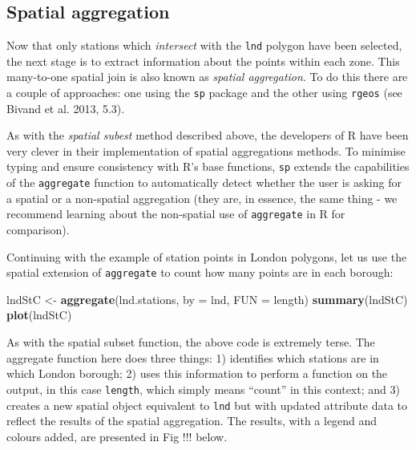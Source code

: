 \documentclass[]{article}
\newenvironment{Shaded}{}{}
\newcommand{\KeywordTok}[1]{\textcolor[rgb]{0.00,0.44,0.13}{\textbf{{#1}}}}
\newcommand{\DataTypeTok}[1]{\textcolor[rgb]{0.56,0.13,0.00}{{#1}}}
\newcommand{\StringTok}[1]{\textcolor[rgb]{0.25,0.44,0.63}{{#1}}}
\newcommand{\NormalTok}[1]{{#1}}
\begin{document}
\subsection{Spatial aggregation}

Now that only stations which \emph{intersect} with the \texttt{lnd}
polygon have been selected, the next stage is to extract information
about the points within each zone. This many-to-one spatial join is also
known as \emph{spatial aggregation}. To do this there are a couple of
approaches: one using the \texttt{sp} package and the other using
\texttt{rgeos} (see Bivand et al. 2013, 5.3).

As with the \emph{spatial subest} method described above, the developers
of R have been very clever in their implementation of spatial
aggregations methods. To minimise typing and ensure consistency with R's
base functions, \texttt{sp} extends the capabilities of the
\texttt{aggregate} function to automatically detect whether the user is
asking for a spatial or a non-spatial aggregation (they are, in essence,
the same thing - we recommend learning about the non-spatial use of
\texttt{aggregate} in R for comparison).

Continuing with the example of station points in London polygons, let us
use the spatial extension of \texttt{aggregate} to count how many points
are in each borough:

\begin{Shaded}
\begin{Highlighting}[]
\NormalTok{lndStC <-}\StringTok{ }\KeywordTok{aggregate}\NormalTok{(lnd.stations, }\DataTypeTok{by =} \NormalTok{lnd, }\DataTypeTok{FUN =} \NormalTok{length)}
\KeywordTok{summary}\NormalTok{(lndStC)}
\KeywordTok{plot}\NormalTok{(lndStC)}
\end{Highlighting}
\end{Shaded}

As with the spatial subset function, the above code is extremely terse.
The aggregate function here does three things: 1) identifies which
stations are in which London borough; 2) uses this information to
perform a function on the output, in this case \texttt{length}, which
simply means ``count'' in this context; and 3) creates a new spatial
object equivalent to \texttt{lnd} but with updated attribute data to
reflect the results of the spatial aggregation. The results, with a
legend and colours added, are presented in Fig !!! below.
\end{document}
